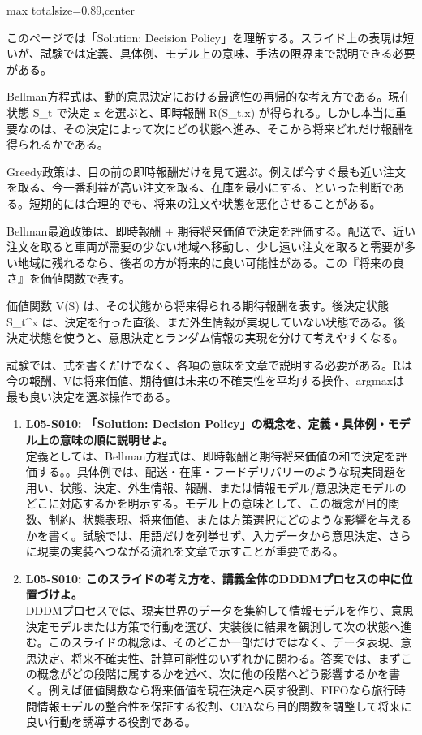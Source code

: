 \begin{minipage}[t]{0.58\textwidth}
\begin{adjustbox}{max totalsize={\textwidth}{0.89\textheight},center}
\begin{minipage}{\textwidth}\scriptsize
{}このページでは「Solution: Decision Policy」を理解する。スライド上の表現は短いが、試験では定義、具体例、モデル上の意味、手法の限界まで説明できる必要がある。\par
Bellman方程式は、動的意思決定における最適性の再帰的な考え方である。現在状態 S\_t で決定 x を選ぶと、即時報酬 R(S\_t,x) が得られる。しかし本当に重要なのは、その決定によって次にどの状態へ進み、そこから将来どれだけ報酬を得られるかである。\par
Greedy政策は、目の前の即時報酬だけを見て選ぶ。例えば今すぐ最も近い注文を取る、今一番利益が高い注文を取る、在庫を最小にする、といった判断である。短期的には合理的でも、将来の注文や状態を悪化させることがある。\par
Bellman最適政策は、即時報酬 + 期待将来価値で決定を評価する。配送で、近い注文を取ると車両が需要の少ない地域へ移動し、少し遠い注文を取ると需要が多い地域に残れるなら、後者の方が将来的に良い可能性がある。この『将来の良さ』を価値関数で表す。\par
価値関数 V(S) は、その状態から将来得られる期待報酬を表す。後決定状態 S\_t\textasciicircum{}x は、決定を行った直後、まだ外生情報が実現していない状態である。後決定状態を使うと、意思決定とランダム情報の実現を分けて考えやすくなる。\par
試験では、式を書くだけでなく、各項の意味を文章で説明する必要がある。Rは今の報酬、Vは将来価値、期待値は未来の不確実性を平均する操作、argmaxは最も良い決定を選ぶ操作である。\par{}\begin{enumerate}\item \textbf{L05-S010: 「Solution: Decision Policy」の概念を、定義・具体例・モデル上の意味の順に説明せよ。}\\定義としては、Bellman方程式は、即時報酬と期待将来価値の和で決定を評価する。。具体例では、配送・在庫・フードデリバリーのような現実問題を用い、状態、決定、外生情報、報酬、または情報モデル/意思決定モデルのどこに対応するかを明示する。モデル上の意味として、この概念が目的関数、制約、状態表現、将来価値、または方策選択にどのような影響を与えるかを書く。試験では、用語だけを列挙せず、入力データから意思決定、さらに現実の実装へつながる流れを文章で示すことが重要である。\item \textbf{L05-S010: このスライドの考え方を、講義全体のDDDMプロセスの中に位置づけよ。}\\DDDMプロセスでは、現実世界のデータを集約して情報モデルを作り、意思決定モデルまたは方策で行動を選び、実装後に結果を観測して次の状態へ進む。このスライドの概念は、そのどこか一部だけではなく、データ表現、意思決定、将来不確実性、計算可能性のいずれかに関わる。答案では、まずこの概念がどの段階に属するかを述べ、次に他の段階へどう影響するかを書く。例えば価値関数なら将来価値を現在決定へ戻す役割、FIFOなら旅行時間情報モデルの整合性を保証する役割、CFAなら目的関数を調整して将来に良い行動を誘導する役割である。\end{enumerate}

\end{minipage}
\end{adjustbox}
\end{minipage}
